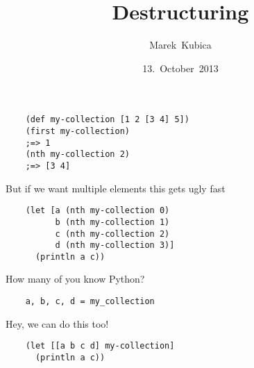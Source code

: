 

\title{Destructuring}
\author{Marek~Kubica}
\date{13.~October~2013}



\frame{\titlepage}




\begin{frame}[fragile]
  \begin{verbatim}
    (def my-collection [1 2 [3 4] 5])
    (first my-collection)
    ;=> 1
    (nth my-collection 2)
    ;=> [3 4]
  \end{verbatim}
\end{frame}

\begin{frame}[fragile]
  \begin{center}
    But if we want multiple elements this gets ugly fast
  \end{center}
  \begin{verbatim}
    (let [a (nth my-collection 0)
          b (nth my-collection 1)
          c (nth my-collection 2)
          d (nth my-collection 3)]
      (println a c))
  \end{verbatim}
\end{frame}

\begin{frame}[fragile]
  \begin{center}
    How many of you know Python?
  \end{center}
  \pause
  \begin{verbatim}
    a, b, c, d = my_collection
  \end{verbatim}
\end{frame}


\begin{frame}[fragile]
  \begin{center}
    Hey, we can do this too!
  \end{center}
  \begin{verbatim}
    (let [[a b c d] my-collection]
      (println a c))
  \end{verbatim}
\end{frame}


